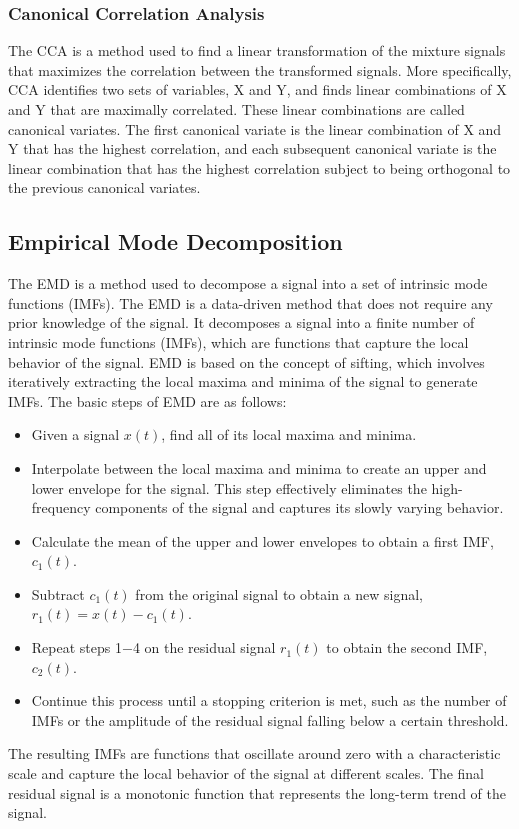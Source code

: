 \documentclass[a4paper]{sapthesis}
\begin{document}
\subsubsection{Canonical Correlation Analysis}
The CCA\cite{cca} is a method used to find a linear transformation of the
mixture signals that maximizes the correlation between the transformed signals.
More specifically, CCA identifies two sets of variables, X and Y, and 
finds linear combinations of X and Y that are maximally correlated. 
These linear combinations are called canonical variates.
 The first canonical variate is the linear combination of X and Y that 
 has the highest correlation, and each subsequent canonical variate is 
 the linear combination that has the highest correlation subject to being
  orthogonal to the previous canonical variates.
\newline

\subsection{Empirical Mode Decomposition}\label{sec:emd}
The EMD\cite{emd} is a method used to decompose a signal into a set of
intrinsic mode functions (IMFs). The EMD is a data-driven method that
does not require any prior knowledge of the signal. \newline
It decomposes a signal into a finite number of intrinsic mode functions
 (IMFs), which are functions that capture the local behavior of the signal.
  EMD is based on the concept of sifting, which involves iteratively
 extracting the local maxima and minima of the signal to generate IMFs.
The basic steps of EMD are as follows:
\begin{itemize}
    \item Given a signal $x(t)$, find all of its local maxima and minima.
    \item Interpolate between the local maxima and minima to create an
    upper and lower envelope for the signal. This step effectively
     eliminates the high-frequency components of the signal and 
     captures its slowly varying behavior.
    \item Calculate the mean of the upper and lower envelopes to obtain a
     first IMF, $c_1(t)$.
    \item Subtract $c_1(t)$ from the original signal to obtain a new signal,
        $r_1(t) = x(t) - c_1(t)$.
    \item Repeat steps 1$-$4 on the residual signal $r_1(t)$ to obtain the
        second IMF, $c_2(t)$.
    \item Continue this process until a stopping criterion is met, such as
        the number of IMFs or the amplitude of the residual signal falling
        below a certain threshold.
\end{itemize}
The resulting IMFs are functions that oscillate around zero with a 
characteristic scale and capture the local behavior of the signal at 
different scales. The final residual signal is a monotonic function that 
represents the long-term trend of the signal.
\end{document}
